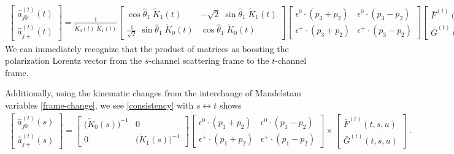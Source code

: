 \documentclass[10pt, aps,prd,amsmath,amssymb,superscriptaddress,onecolumn,
nofootinbib,showpacs,preprintnumbers]{revtex4-1}
\begin{document}
\begin{align}
  \label{consistency}
  \begin{bmatrix}
 \hat{a}^{(t)}_{j0}(t) \\
 \hat{a}^{(t)}_{j+}(t)
  \end{bmatrix}
  =
  \frac{1}{\tilde{K}_{0}(t) \; \tilde{K}_{1}(t)}
  \begin{bmatrix}
      \cos \hat{\theta}_1 \;  \tilde{K}_{1}(t)   &  - \sqrt{2} \; \sin \hat{\theta}_1 \; \tilde{K}_{1}(t) \\
     \frac{1}{\sqrt{2}}  \; \sin \hat{\theta}_1 \;  \tilde{K}_{0}(t)  & \cos \hat{\theta}_1 \; \tilde{K}_{0}(t)
  \end{bmatrix}
  \begin{bmatrix}
    \epsilon^0 \cdot (p_3 + p_2) & \epsilon^0 \cdot (p_3 - p_2) \\
  \epsilon^+ \cdot (p_3 + p_2) & \epsilon^+ \cdot (p_3 - p_2)
  \end{bmatrix}
  \begin{bmatrix}
     \bar{F}^{(t)}(s,t,u)  \\
     \bar{G}^{(t)}(s,t,u)
  \end{bmatrix}
   \; .
 \end{align}
We can immediately recognize that the product of matrices as boosting the polarization Lorentz vector from the \(s\)-channel scattering frame to the \(t\)-channel frame.

Additionally, using the kinematic changes from the interchange of Mandelstam variables \cref{frame-change},
we see \cref{consistency} with \(s\leftrightarrow t\) shows
\begin{align}
  \begin{bmatrix}
   \hat{a}^{(t)}_{j0}(s) \\
   \hat{a}^{(t)}_{j+}(s)
  \end{bmatrix}
  =
  \begin{bmatrix}
  \big( \tilde{K}_{0}(s) \big)^{-1} & 0 \\
  0 &   \big( \tilde{K}_{1}(s) \big)^{-1}
  \end{bmatrix}
  \begin{bmatrix}
    \epsilon^0 \cdot (p_1 + p_2) & \epsilon^0 \cdot (p_1 - p_2) \\
  \epsilon^+ \cdot (p_1 + p_2) & \epsilon^+ \cdot (p_1 - p_2)
  \end{bmatrix}
  \times
  \begin{bmatrix}
     \bar{F}^{(t)}(t,s,u)  \\
     \bar{G}^{(t)}(t,s,u)
  \end{bmatrix}
   \; .
 \end{align}
\end{document}
